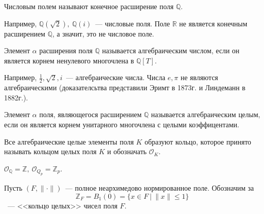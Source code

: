 \documentclass[11pt]{report}
\begin{document}
    \begin{definition}
        Числовым полем называют конечное расширение поля $\mathbb{Q}$.
    \end{definition}
    \begin{example}
        Например,  $\mathbb{Q}(\sqrt{2}), \ \mathbb{Q}(i)$~--- числовые поля. Поле $\mathbb{R}$ не является конечным расширением
        $\mathbb{Q}$, а значит, это не числовое поле.
    \end{example}
    \begin{definition}
        Элемент $\alpha$ расширения поля $\mathbb{Q}$ называется алгебраическим числом, если он является корнем ненулевого многочлена
        в $\mathbb{Q}[T]$.
    \end{definition}
    \begin{example}
        Например, $\frac{1}{2}, \sqrt{2}, i$~--- алгебраические числа. Числа $e, \pi$ не являются алгебраическими (доказателсьтва представили
        Эримт в 1873г. и Линдеманн в 1882г.).
    \end{example}
    \begin{definition}
        Элемент $\alpha$ поля, являющегося расширением $\mathbb{Q}$ называется алгебраическим целым, если он является корнем унитарного многочлена
        с целыми коэффицентами.
    \end{definition}
    \begin{definition}
        Все алгебраические целые элементы поля $K$ образуют кольцо, которое принято называть кольцом целых поля $K$ и обозначать $\mathcal{O}_{K}$.
    \end{definition}
    \begin{example}
        $\mathcal{O}_{\mathbb{Q}} = \mathbb{Z}, \ \mathcal{O}_{Q_{p}} = \mathbb{Z}_p$.
    \end{example}
    \begin{definition}
        Пусть $(F, \| \cdot \|)$~--- полное неархимедово нормированное поле. Обозначим за
        \[ \mathbb{Z}_{F} = B_1(0) = \{ x \in F \ | \ \| x \| \le 1 \} \]
        ~--- <<кольцо целых>> чисел поля $F$.
    \end{definition}
\end{document}
